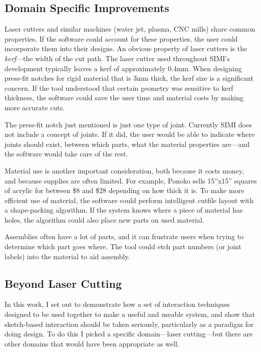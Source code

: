 \subsection{Domain Specific Improvements}

Laser cutters and similar machines (water jet, plasma, CNC mills)
share common properties. If the software could account for these
properties, the user could incorporate them into their designs. An
obvious property of laser cutters is the \textit{kerf}---the width of
the cut path. The laser cutter used throughout SIMI's development
typically leaves a kerf of approximately 0.4mm. When designing
press-fit notches for rigid material that is 3mm thick, the kerf size
is a significant concern. If the tool understood that certain geometry
was sensitive to kerf thickness, the software could save the user time
and material costs by making more accurate cuts.

The press-fit notch just mentioned is just one type of
joint. Currently SIMI does not include a concept of joints. If it did,
the user would be able to indicate where joints should exist, between
which parts, what the material properties are---and the software would
take care of the rest.

Material use is another important consideration, both because it costs
money, and because supplies are often limited. For example, Ponoko
sells 15''x15'' squares of acrylic for between \$8 and \$28 depending
on how thick it is. To make more efficient use of material, the
software could perform intelligent cutfile layout with a shape-packing
algorithm. If the system knows where a piece of material has holes,
the algorithm could also place new parts on used material.

Assemblies often have a lot of parts, and it can frustrate users when
trying to determine which part goes where. The tool could etch part
numbers (or joint labels) into the material to aid assembly.

\subsection{Beyond Laser Cutting}

In this work, I set out to demonstrate how a set of interaction
techniques designed to be used together to make a useful and useable
system, and show that sketch-based interaction should be taken
seriously, particularly as a paradigm for doing design. To do this I
picked a specific domain---laser cutting---but there are other domains
that would have been appropriate as well. 

